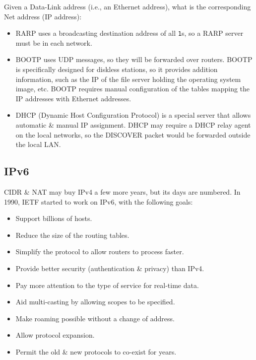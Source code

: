\documentclass[11pt]{article}
\begin{document}
Given a Data-Link address (i.e., an Ethernet address), what is the corresponding Net address (IP address):
\begin{itemize}
    \item   RARP uses a broadcasting destination address of all \verb|1|s, so a RARP server must be in each network.
    \item   BOOTP uses UDP messages, so they will be forwarded over routers. 
            BOOTP is specifically designed for diskless stations, so it provides addition information, such as the IP of the file server holding the operating system image, etc.
            BOOTP requires manual configuration of the tables mapping the IP addresses with Ethernet addresses.
    \item   DHCP (Dynamic Host Configuration Protocol) is a special server that allows automatic \& manual IP assignment.
            DHCP may require a DHCP relay agent on the local networks, so the DISCOVER packet would be forwarded outside the local LAN.
\end{itemize}

\newpage
\subsection{IPv6}
CIDR \& NAT may buy IPv4 a few more years, but its days are numbered.
In 1990, IETF started to work on IPv6, with the following goals:
\begin{itemize}
    \item   Support billions of hosts. 
    \item   Reduce the size of the routing tables.
    \item   Simplify the protocol to allow routers to process faster.
    \item   Provide better security (authentication \& privacy) than IPv4.
    \item   Pay more attention to the type of service for real-time data.
    \item   Aid multi-casting by allowing scopes to be specified.
    \item   Make roaming possible without a change of address.
    \item   Allow protocol expansion.
    \item   Permit the old \& new protocols to co-exist for years.
\end{itemize}
\end{document}
